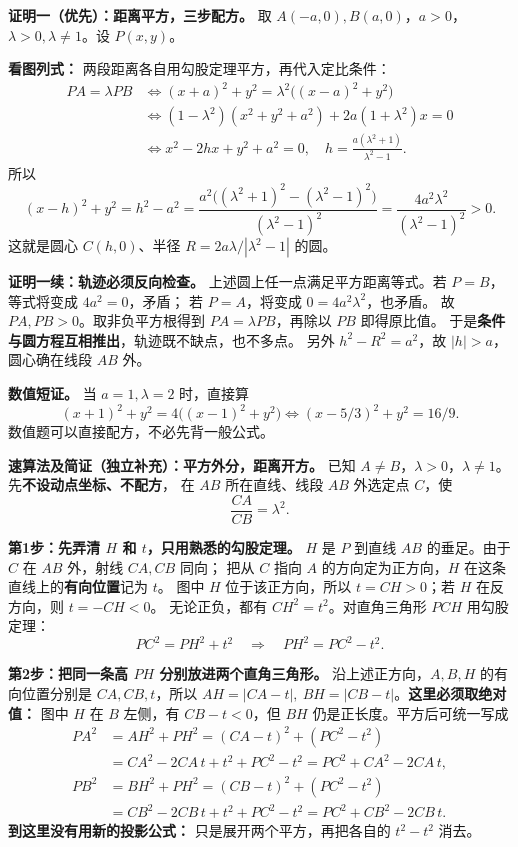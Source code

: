 \clearpage
\begin{proofbox}
\textbf{证明一（优先）：距离平方，三步配方。}
取 $A(-a,0),B(a,0)$，$a>0$，$\lambda>0,\lambda\ne1$。设 $P(x,y)$。

\textbf{看图列式：} 两段距离各自用勾股定理平方，再代入定比条件：
\[
\begin{aligned}
 PA=\lambda PB
 &\Longleftrightarrow (x+a)^2+y^2
       =\lambda^2\bigl((x-a)^2+y^2\bigr)\\
 &\Longleftrightarrow
 (1-\lambda^2)(x^2+y^2+a^2)+2a(1+\lambda^2)x=0\\
 &\Longleftrightarrow x^2-2hx+y^2+a^2=0,
 \quad h=\frac{a(\lambda^2+1)}{\lambda^2-1}.
\end{aligned}
\]
所以
\[
 (x-h)^2+y^2=h^2-a^2
 =\frac{a^2\bigl((\lambda^2+1)^2-(\lambda^2-1)^2\bigr)}{(\lambda^2-1)^2}
 =\frac{4a^2\lambda^2}{(\lambda^2-1)^2}>0.
\]
这就是圆心 $C(h,0)$、半径 $R=2a\lambda/|\lambda^2-1|$ 的圆。

\tcbbreak
\textbf{证明一续：轨迹必须反向检查。}
上述圆上任一点满足平方距离等式。若 $P=B$，等式将变成 $4a^2=0$，矛盾；
若 $P=A$，将变成 $0=4a^2\lambda^2$，也矛盾。
故 $PA,PB>0$。取非负平方根得到 $PA=\lambda PB$，再除以 $PB$ 即得原比值。
于是\textbf{条件与圆方程互相推出}，轨迹既不缺点，也不多点。
另外 $h^2-R^2=a^2$，故 $|h|>a$，圆心确在线段 $AB$ 外。

\textbf{数值短证。} 当 $a=1,\lambda=2$ 时，直接算
\[
 (x+1)^2+y^2=4\bigl((x-1)^2+y^2\bigr)
 \Longleftrightarrow
 (x-5/3)^2+y^2=16/9.
\]
数值题可以直接配方，不必先背一般公式。

\tcbbreak
\textbf{速算法及简证（独立补充）：平方外分，距离开方。}
已知 $A\ne B$，$\lambda>0$，$\lambda\ne1$。先\textbf{不设动点坐标、不配方}，
在 $AB$ 所在直线、线段 $AB$ 外选定点 $C$，使
\[
 \boxed{\frac{CA}{CB}=\lambda^2}.
\]

\textbf{第1步：先弄清 $H$ 和 $t$，只用熟悉的勾股定理。}
$H$ 是 $P$ 到直线 $AB$ 的垂足。由于 $C$ 在 $AB$ 外，射线 $CA,CB$ 同向；
把从 $C$ 指向 $A$ 的方向定为正方向，$H$ 在这条直线上的\textbf{有向位置}记为 $t$。
图中 $H$ 位于该正方向，所以 $t=CH>0$；若 $H$ 在反方向，则 $t=-CH<0$。
无论正负，都有 $CH^2=t^2$。对直角三角形 $PCH$ 用勾股定理：
\[
 PC^2=PH^2+t^2
 \quad\Longrightarrow\quad \boxed{PH^2=PC^2-t^2}.
\]

\textbf{第2步：把同一条高 $PH$ 分别放进两个直角三角形。}
沿上述正方向，$A,B,H$ 的有向位置分别是 $CA,CB,t$，所以
$AH=|CA-t|,\ BH=|CB-t|$。\textbf{这里必须取绝对值：}
图中 $H$ 在 $B$ 左侧，有 $CB-t<0$，但 $BH$ 仍是正长度。平方后可统一写成
\[
\begin{aligned}
 PA^2&=AH^2+PH^2=(CA-t)^2+(PC^2-t^2)\\
     &=CA^2-2CA\,t+t^2+PC^2-t^2
      =\boxed{PC^2+CA^2-2CA\,t},\\[3pt]
 PB^2&=BH^2+PH^2=(CB-t)^2+(PC^2-t^2)\\
     &=CB^2-2CB\,t+t^2+PC^2-t^2
      =\boxed{PC^2+CB^2-2CB\,t}.
\end{aligned}
\]
\textbf{到这里没有用新的投影公式：} 只是展开两个平方，再把各自的 $t^2-t^2$ 消去。


\end{proofbox}
